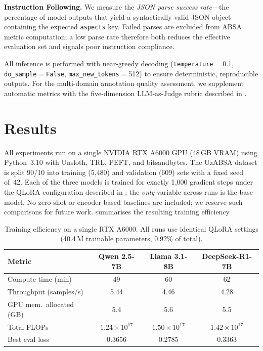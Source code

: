 \documentclass[computers,article,submit,pdftex,moreauthors]{Definitions/mdpi}
\begin{document}
\textbf{Instruction Following.} We measure the \emph{JSON parse success rate}---the percentage of model outputs that yield a syntactically valid JSON object containing the expected \texttt{aspects} key. Failed parses are excluded from ABSA metric computation; a low parse rate therefore both reduces the effective evaluation set and signals poor instruction compliance.

All inference is performed with near-greedy decoding (\texttt{temperature}$=$0.1, \texttt{do\_sample}$=$\texttt{False}, \texttt{max\_new\_tokens}$=$512) to ensure deterministic, reproducible outputs. For the multi-domain annotation quality assessment, we supplement automatic metrics with the five-dimension LLM-as-Judge rubric described in .



\section{Results}
\label{sec:results}

All experiments run on a single NVIDIA RTX A6000 GPU (48\,GB VRAM) using Python~3.10 with Unsloth, TRL, PEFT, and bitsandbytes. The UzABSA dataset is split 90/10 into training (5{,}480) and validation (609) sets with a fixed seed of~42. Each of the three models is trained for exactly 1{,}000 gradient steps under the QLoRA configuration described in ; the \emph{only} variable across runs is the base model. No zero-shot or encoder-based baselines are included; we reserve such comparisons for future work.  summarises the resulting training efficiency.

\begin{table}[t]
\centering
\caption{Training efficiency on a single RTX A6000. All runs use identical QLoRA settings (40.4\,M trainable parameters, 0.92\% of total).}
\label{tab:train_efficiency}
\setlength{\tabcolsep}{4pt}
\begin{tabular}{lccc}
\toprule
\textbf{Metric} & \textbf{Qwen 2.5-7B} & \textbf{Llama 3.1-8B} & \textbf{DeepSeek-R1-7B} \\
\midrule
Compute time (min)       & 49   & 60   & 62   \\
Throughput (samples/s)   & 5.44 & 4.46 & 4.28 \\
GPU mem.\ allocated (GB) & 5.4  & 5.6  & 5.5  \\
Total FLOPs              & $1.24\!\times\!10^{17}$ & $1.50\!\times\!10^{17}$ & $1.42\!\times\!10^{17}$ \\
Best eval loss           & 0.3656 & 0.2785 & 0.3363 \\
\bottomrule
\end{tabular}
\end{table}
\end{document}
